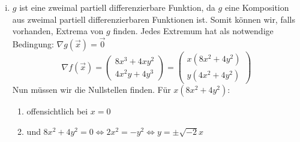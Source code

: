 \documentclass[10pt,a4paper,parskip=half]{scrartcl}
\begin{document}
\begin{enumerate}[(i)]
	\item	
\(g\) ist eine zweimal partiell differenzierbare Funktion, da \(g\) eine Komposition aus zweimal partiell differenzierbaren Funktionen ist. Somit können wir, falls vorhanden, Extrema von $g$ finden. Jedes Extremum hat als notwendige Bedingung: $\nabla g(\vec x) = \vec 0$
	\[ \nabla f (\vec x) = 
	\begin{pmatrix}
		8x^3  +4xy^2\\
		 4x^2y + 4y^3
	\end{pmatrix} =  
	\begin{pmatrix}
		x(8x^2+4y^2) \\
		y(4x^2 +  4y^2)
	\end{pmatrix}  \]
Nun müssen wir die Nullstellen finden. Für $x(8x^2+4y^2)$:
\begin{enumerate}
\item offensichtlich bei $x=0$
\item und $8x^2+4y^2 = 0 \Leftrightarrow 2x^2 = -y^2 \Leftrightarrow y = \pm \sqrt{-2} x$
\end{enumerate}

	\end{enumerate}
\end{document}
